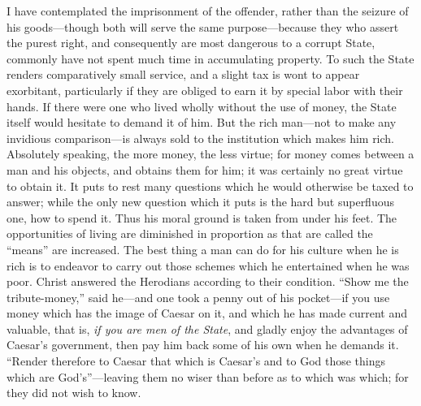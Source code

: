 \documentclass[12pt]{article}
\begin{document}
I have contemplated the imprisonment of the offender, rather than the
seizure of his goods---though both will serve the same purpose---because
they who assert the purest right, and consequently are most dangerous to
a corrupt State, commonly have not spent much time in accumulating
property. To such the State renders comparatively small service, and a
slight tax is wont to appear exorbitant, particularly if they are
obliged to earn it by special labor with their hands. If there were one
who lived wholly without the use of money, the State itself would
hesitate to demand it of him. But the rich man---not to make any
invidious comparison---is always sold to the institution which makes him
rich. Absolutely speaking, the more money, the less virtue; for money
comes between a man and his objects, and obtains them for him; it was
certainly no great virtue to obtain it. It puts to rest many questions
which he would otherwise be taxed to answer; while the only new question
which it puts is the hard but superfluous one, how to spend it. Thus his
moral ground is taken from under his feet. The opportunities of living
are diminished in proportion as that are called the ``means'' are
increased. The best thing a man can do for his culture when he is rich
is to endeavor to carry out those schemes which he entertained when he
was poor. Christ answered the Herodians according to their condition.
``Show me the tribute-money,'' said he---and one took a penny out of his
pocket---if you use money which has the image of Caesar on it, and which
he has made current and valuable, that is, \emph{if you are men of the
State}, and gladly enjoy the advantages of Caesar's government, then pay
him back some of his own when he demands it. ``Render therefore to
Caesar that which is Caesar's and to God those things which are
God's''---leaving them no wiser than before as to which was which; for
they did not wish to know.
\end{document}
